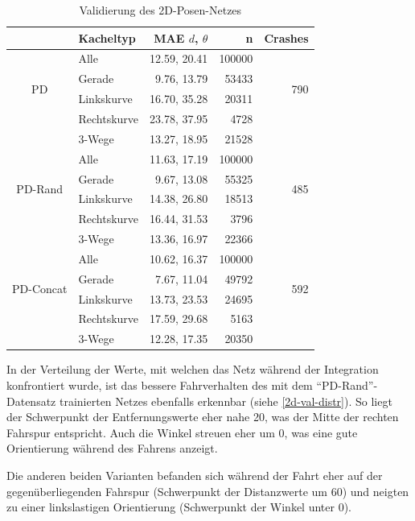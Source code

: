 \begin{table}[H]
	\centering
	\begin{tabular}[t]{|c|l|r|r|r|}
		\hline
		& \textbf{Kacheltyp} & \textbf{MAE $d$, $\theta$} & \textbf{n} & Crashes \\
		\hline
		\multirow{4}{*}{PD} 
		& Alle
		& 12.59, 20.41
		& 100000
		& \multirow{4}{*}{790}\\
		\cline{2-4}
		& Gerade
		&  9.76, 13.79
		& 53433
		&\\
		\cline{2-4}
		& Linkskurve
		& 16.70,  35.28
		& 20311
		&\\
		\cline{2-4}
		& Rechtskurve
		& 23.78, 37.95 
		& 4728
		&\\
		\cline{2-4}
		& 3-Wege
		&  13.27, 18.95
		& 21528
		&\\
		\hline
		\multirow{4}{*}{PD-Rand} 
		& Alle
		& 11.63, 17.19
		& 100000
		& \multirow{4}{*}{485}\\
		\cline{2-4}
		& Gerade
		&  9.67, 13.08
		& 55325 & \\
		\cline{2-4}
		& Linkskurve
		& 14.38, 26.80
		& 18513
		&\\
		\cline{2-4}
		& Rechtskurve
		& 16.44, 31.53
		& 3796
		&\\
		\cline{2-4}
		& 3-Wege
		& 13.36, 16.97
		& 22366
		&\\
		\hline
		\multirow{4}{*}{PD-Concat} 
		& Alle
		& 10.62, 16.37
		& 100000
		& \multirow{4}{*}{592}\\
		\cline{2-4}
		& Gerade
		& 7.67, 11.04
		& 49792
		&\\
		\cline{2-4}
		& Linkskurve
		& 13.73, 23.53
		& 24695
		&\\
		\cline{2-4}
		& Rechtskurve
		& 17.59, 29.68
		& 5163
		&\\
		\cline{2-4}
		& 3-Wege
		& 12.28, 17.35
		& 20350
		&\\
		\hline
	\end{tabular}
	\caption{Validierung des 2D-Posen-Netzes}
	\label{2d-validation}
\end{table}

In der Verteilung der Werte, mit welchen das Netz während der Integration konfrontiert wurde, ist das bessere Fahrverhalten des mit dem ``PD-Rand''-Datensatz trainierten Netzes ebenfalls erkennbar (siehe \ref{2d-val-distr}). So liegt der Schwerpunkt der Entfernungswerte eher nahe 20, was der Mitte der rechten Fahrspur entspricht. Auch die Winkel streuen eher um 0, was eine gute Orientierung während des Fahrens anzeigt.

Die anderen beiden Varianten befanden sich während der Fahrt eher auf der gegenüberliegenden Fahrspur (Schwerpunkt der Distanzwerte um 60) und neigten zu einer linkslastigen Orientierung (Schwerpunkt der Winkel unter 0).

